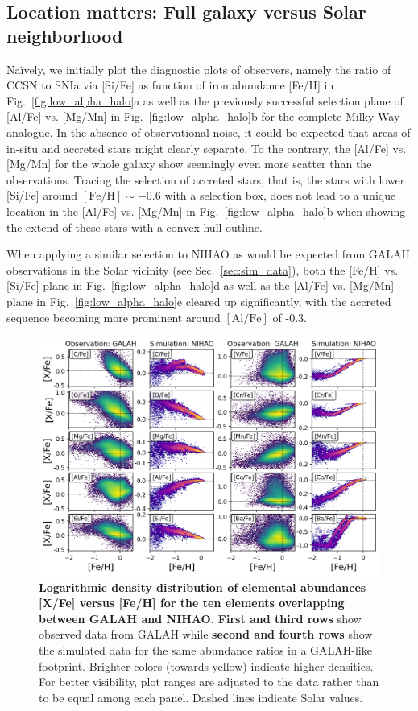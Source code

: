 \documentclass[fleqn,usenatbib]{mnras}
\begin{document}
\subsection{Location matters: Full galaxy versus Solar neighborhood} \label{sec:location}

Naïvely, we initially plot the diagnostic plots of observers, namely the ratio of CCSN to SNIa via [Si/Fe] as function of iron abundance [Fe/H] in Fig.~\ref{fig:low_alpha_halo}a as well as the previously successful selection plane of [Al/Fe] vs. [Mg/Mn] in Fig.~\ref{fig:low_alpha_halo}b for the complete Milky Way analogue. In the absence of observational noise, it could be expected that areas of in-situ and accreted stars might clearly separate. To the contrary, the [Al/Fe] vs. [Mg/Mn] for the whole galaxy show seemingly even more scatter than the observations. Tracing the selection of accreted stars, that is, the stars with lower [Si/Fe] around $\mathrm{[Fe/H]} \sim -0.6$ with a selection box, does not lead to a unique location in the [Al/Fe] vs. [Mg/Mn] in Fig.~\ref{fig:low_alpha_halo}b when showing the extend of these stars with a convex hull outline.

When applying a similar selection to NIHAO as would be expected from GALAH observations in the Solar vicinity (see Sec.~\ref{sec:sim_data}), both the [Fe/H] vs. [Si/Fe] plane in Fig.~\ref{fig:low_alpha_halo}d as well as the [Al/Fe] vs. [Mg/Mn] plane in Fig.~\ref{fig:low_alpha_halo}e cleared up significantly, with the accreted sequence becoming more prominent around $\mathrm{[Al/Fe]}$ of -0.3.

\begin{figure}
	\includegraphics[width=\textwidth]{figures/Overview_FeH_XFe_Obs_Sim.png}
    \caption{
    \textbf{Logarithmic density distribution of elemental abundances [X/Fe] versus [Fe/H] for the ten elements overlapping between GALAH and NIHAO.} 
    \textbf{First and third rows} show observed data from GALAH while \textbf{second and fourth rows} show the simulated data for the same abundance ratios in a GALAH-like footprint. Brighter colors (towards yellow) indicate higher densities. For better visibility, plot ranges are adjusted to the data rather than to be equal among each panel. Dashed lines indicate Solar values.}
    \label{fig:FeH_XFe}
\end{figure}
\end{document}
